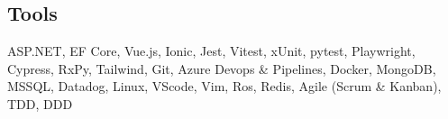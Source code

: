 
\subsection{Tools}

\cvline{}
{
  ASP.NET, EF Core, Vue.js, Ionic,
  Jest, Vitest, xUnit, pytest, Playwright, Cypress,
  RxPy,
  Tailwind,
  Git,
  Azure Devops \& Pipelines, Docker,
  MongoDB,
  MSSQL,
  Datadog,
  Linux,
  VScode, Vim,
  Ros,  Redis,
  Agile (Scrum \& Kanban), TDD, DDD }{}{}{}{}

